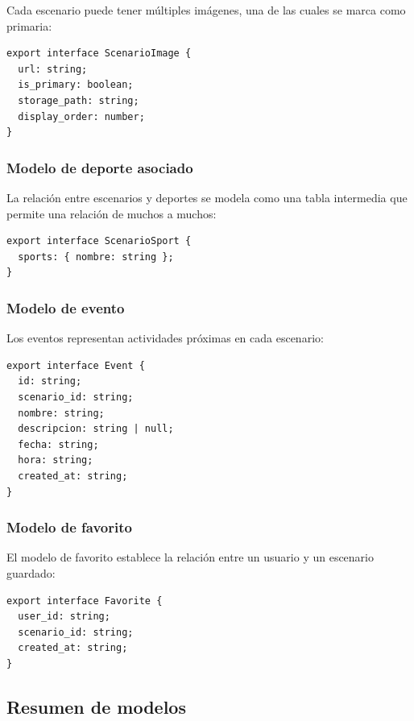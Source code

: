 Cada escenario puede tener m\'ultiples im\'agenes, una de las cuales se marca
como primaria:

\begin{lstlisting}
export interface ScenarioImage {
  url: string;
  is_primary: boolean;
  storage_path: string;
  display_order: number;
}
\end{lstlisting}

\subsubsection{Modelo de deporte asociado}

La relaci\'on entre escenarios y deportes se modela como una tabla intermedia
que permite una relaci\'on de muchos a muchos:

\begin{lstlisting}
export interface ScenarioSport {
  sports: { nombre: string };
}
\end{lstlisting}

\subsubsection{Modelo de evento}

Los eventos representan actividades pr\'oximas en cada escenario:

\begin{lstlisting}
export interface Event {
  id: string;
  scenario_id: string;
  nombre: string;
  descripcion: string | null;
  fecha: string;
  hora: string;
  created_at: string;
}
\end{lstlisting}

\subsubsection{Modelo de favorito}

El modelo de favorito establece la relaci\'on entre un usuario y un escenario
guardado:

\begin{lstlisting}
export interface Favorite {
  user_id: string;
  scenario_id: string;
  created_at: string;
}
\end{lstlisting}

\subsection{Resumen de modelos}

